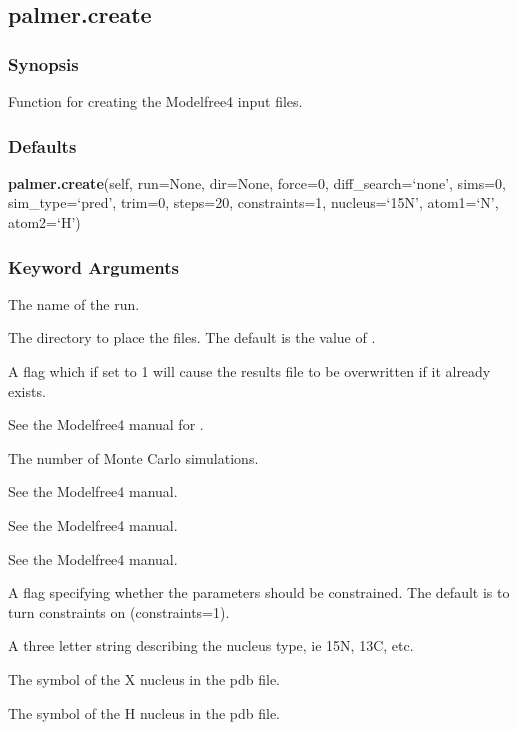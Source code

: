 \newpage

\subsection{palmer.create}


\subsubsection{Synopsis}

Function for creating the Modelfree4 input files.

\subsubsection{Defaults}

\textsf{\textbf{palmer.create}(self, run=None, dir=None, force=0, diff\_search=`none', sims=0, sim\_type=`pred', trim=0, steps=20, constraints=1, nucleus=`15N', atom1=`N', atom2=`H')}


\subsubsection{Keyword Arguments}


  The name of the run.

  The directory to place the files.  The default is the value of 
.

  A flag which if set to 1 will cause the results file to be overwritten if it already exists.

  See the Modelfree4 manual for 
.

  The number of Monte Carlo simulations.

  See the Modelfree4 manual.

  See the Modelfree4 manual.

  See the Modelfree4 manual.

  A flag specifying whether the parameters should be constrained.  The default is to turn constraints on (constraints=1).

  A three letter string describing the nucleus type, ie 15N, 13C, etc.

  The symbol of the X nucleus in the pdb file.

  The symbol of the H nucleus in the pdb file.

